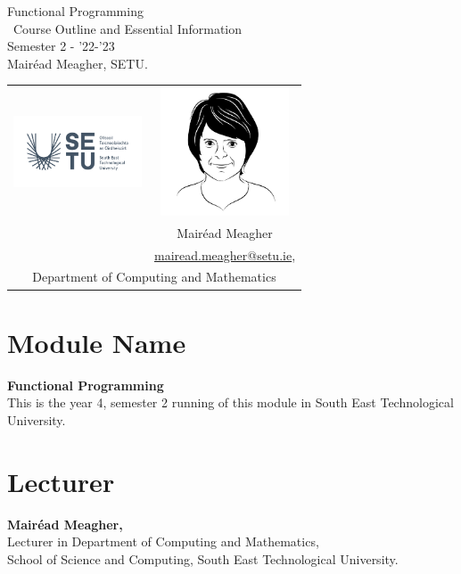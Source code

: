 \documentclass{article}
\author{Mair\'ead Meagher, SETU}
\newcommand\ExTitle{\ Course Outline and Essential Information}
\newcommand\fullExTitle{Functional Programming
\\ \ExTitle \\Semester 2 - '22-'23 }
\begin{document}
\begin{Huge}
	\begin{center}
	\fullExTitle \\
    \vspace{.1cm}
    Mair\'ead Meagher, SETU.
    \end{center}
\end{Huge}
\begin{center}
    \begin{tabular}{|c |  c | }
 
    \hline
    \includegraphics[width=1.5in]{img/RGB.png} &          \includegraphics[width=1.5in]{img/mairead-avatar.jpeg} \\ 

   
    
        & Mair\'ead Meagher  \\  
       & \href{mailto:mmeagher@wit.ie}{mairead.meagher@setu.ie}, \\

    \hline
    \multicolumn{2}{|c|}{Department of Computing and Mathematics} \\
     \hline

  
    \end{tabular}
\end{center}

\tableofcontents
\pagebreak
\section{Module Name}   
\Large{ \textbf{Functional Programming} }\\
This is the year 4, semester 2 running of this module in South East Technological University. 
\section{Lecturer}
\Large{ \textbf{Mair\'ead Meagher,}} \\
Lecturer in Department of Computing and Mathematics, \\
School of Science and Computing,
South East Technological University.
\end{document}
